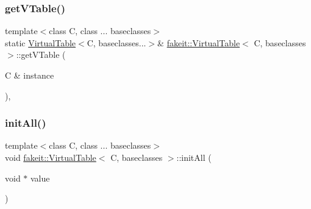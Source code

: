 \subsubsection{\texorpdfstring{getVTable()}{getVTable()}\hspace{0.1cm}{\footnotesize\ttfamily [10/10]}}
{\footnotesize\ttfamily template$<$class C, class ... baseclasses$>$ \\
static \mbox{\hyperlink{structfakeit_1_1VirtualTable}{Virtual\+Table}}$<$C, baseclasses...$>$\& \mbox{\hyperlink{structfakeit_1_1VirtualTable}{fakeit\+::\+Virtual\+Table}}$<$ C, baseclasses $>$\+::get\+V\+Table (\begin{DoxyParamCaption}\item[{C \&}]{instance }\end{DoxyParamCaption})\hspace{0.3cm}{\ttfamily [inline]}, {\ttfamily [static]}}

\mbox{\label{structfakeit_1_1VirtualTable_a261b66b33067b4425791762cb3786f20}} 
\subsubsection{\texorpdfstring{initAll()}{initAll()}\hspace{0.1cm}{\footnotesize\ttfamily [1/10]}}
{\footnotesize\ttfamily template$<$class C, class ... baseclasses$>$ \\
void \mbox{\hyperlink{structfakeit_1_1VirtualTable}{fakeit\+::\+Virtual\+Table}}$<$ C, baseclasses $>$\+::init\+All (\begin{DoxyParamCaption}\item[{void $\ast$}]{value }\end{DoxyParamCaption})\hspace{0.3cm}{\ttfamily [inline]}}

\mbox{\label{structfakeit_1_1VirtualTable_a261b66b33067b4425791762cb3786f20}} 
